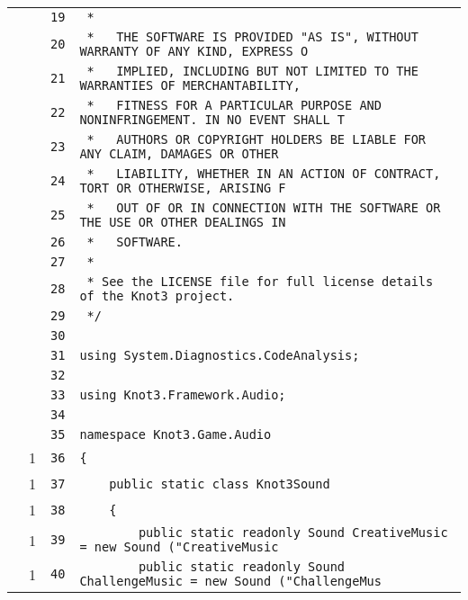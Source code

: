 \documentclass[a4paper,10pt]{article}
\begin{document}
\begin{longtable}[l]{lrrl}
\cellcolor{gray} &  & \verb~19~ & \verb~ *~\\
\cellcolor{gray} &  & \verb~20~ & \verb~ *   THE SOFTWARE IS PROVIDED "AS IS", WITHOUT WARRANTY OF ANY KIND, EXPRESS O~\\
\cellcolor{gray} &  & \verb~21~ & \verb~ *   IMPLIED, INCLUDING BUT NOT LIMITED TO THE WARRANTIES OF MERCHANTABILITY,~\\
\cellcolor{gray} &  & \verb~22~ & \verb~ *   FITNESS FOR A PARTICULAR PURPOSE AND NONINFRINGEMENT. IN NO EVENT SHALL T~\\
\cellcolor{gray} &  & \verb~23~ & \verb~ *   AUTHORS OR COPYRIGHT HOLDERS BE LIABLE FOR ANY CLAIM, DAMAGES OR OTHER~\\
\cellcolor{gray} &  & \verb~24~ & \verb~ *   LIABILITY, WHETHER IN AN ACTION OF CONTRACT, TORT OR OTHERWISE, ARISING F~\\
\cellcolor{gray} &  & \verb~25~ & \verb~ *   OUT OF OR IN CONNECTION WITH THE SOFTWARE OR THE USE OR OTHER DEALINGS IN~\\
\cellcolor{gray} &  & \verb~26~ & \verb~ *   SOFTWARE.~\\
\cellcolor{gray} &  & \verb~27~ & \verb~ *~\\
\cellcolor{gray} &  & \verb~28~ & \verb~ * See the LICENSE file for full license details of the Knot3 project.~\\
\cellcolor{gray} &  & \verb~29~ & \verb~ */~\\
\cellcolor{gray} &  & \verb~30~ & \verb~~\\
\cellcolor{gray} &  & \verb~31~ & \verb~using System.Diagnostics.CodeAnalysis;~\\
\cellcolor{gray} &  & \verb~32~ & \verb~~\\
\cellcolor{gray} &  & \verb~33~ & \verb~using Knot3.Framework.Audio;~\\
\cellcolor{gray} &  & \verb~34~ & \verb~~\\
\cellcolor{gray} &  & \verb~35~ & \verb~namespace Knot3.Game.Audio~\\
\cellcolor{green} & 1 & \verb~36~ & \verb~{~\\
\cellcolor{green} & 1 & \verb~37~ & \verb~    public static class Knot3Sound~\\
\cellcolor{green} & 1 & \verb~38~ & \verb~    {~\\
\cellcolor{green} & 1 & \verb~39~ & \verb~        public static readonly Sound CreativeMusic = new Sound ("CreativeMusic~\\
\cellcolor{green} & 1 & \verb~40~ & \verb~        public static readonly Sound ChallengeMusic = new Sound ("ChallengeMus~\\

\end{longtable}
\end{document}
